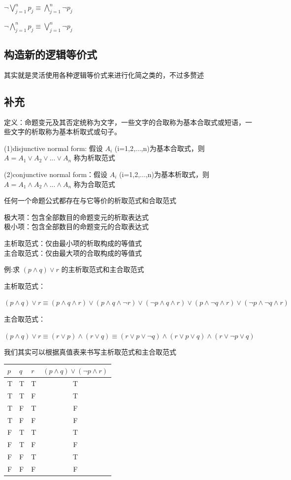 \documentclass[12pt,a4paper,oneside]{ctexart}
\begin{document}
\(\neg\bigvee^n_{j=1}p_j\equiv\bigwedge^n_{j=1}\neg p_j\)

\(\neg\bigwedge^n_{j=1}p_j\equiv\bigvee^n_{j=1}\neg p_j\)

\subsection*{构造新的逻辑等价式}

其实就是灵活使用各种逻辑等价式来进行化简之类的，不过多赘述

\subsection*{补充}

定义：命题变元及其否定统称为文字，一些文字的合取称为基本合取式或短语，一些文字的析取称为基本析取式或句子。

(1)disjunctive normal form: 假设 \(A_i\) (i=1,2,...,n)为基本合取式，则 \(A=A_1\vee A_2\vee...\vee A_n\) 称为析取范式

(2)conjunctive normal form：假设 \(A_i\) (i=1,2,...,n)为基本析取式，则 \(A=A_1\wedge A_2\wedge...\wedge A_n\) 称为合取范式

任何一个命题公式都存在与它等价的析取范式和合取范式

极大项：包含全部数目的命题变元的析取表达式\\
极小项：包含全部数目的命题变元的合取表达式

主析取范式：仅由最小项的析取构成的等值式\\
主合取范式：仅由最大项的合取构成的等值式

例:求 \((p\wedge q)\vee r\) 的主析取范式和主合取范式

主析取范式：

\((p\wedge q)\vee r\equiv(p\wedge q\wedge r)\vee(p\wedge q\wedge \neg r)\vee(\neg p\wedge q\wedge r)\vee(p\wedge \neg q\wedge r)\vee(\neg p\wedge \neg q\wedge r)\)

主合取范式：

\((p\wedge q)\vee r\equiv(r\vee p)\wedge(r\vee q)\equiv(r\vee p\vee \neg q)\wedge(r\vee p\vee q)\wedge(r\vee\neg p\vee q)\)

我们其实可以根据真值表来书写主析取范式和主合取范式

\begin{tabular}{@{}lllc@{}}
\hline
\(p\) & \(q\) & \(r\) & \((p\wedge q)\vee(\neg p\wedge r)\) \\
\hline
T & T & T & T \\
T & T & F & T \\
T & F & T & F \\
T & F & F & F \\
F & T & T & T \\
F & T & F & F \\
F & F & T & T \\
F & F & F & F \\
\hline
\end{tabular}
\end{document}
